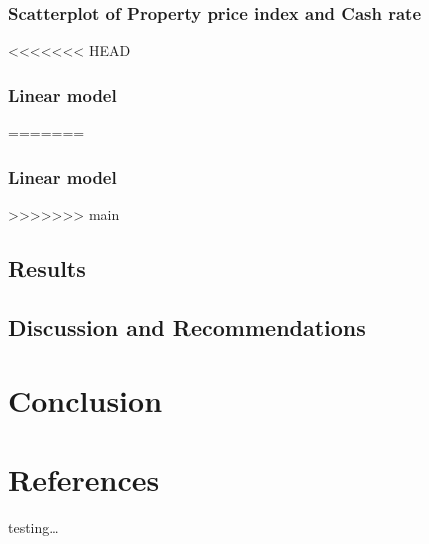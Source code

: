 \documentclass[11pt,a4paper,]{article}
\begin{document}
\hypertarget{scatterplot-of-property-price-index-and-cash-rate}{%
\subsubsection{Scatterplot of Property price index and Cash rate}\label{scatterplot-of-property-price-index-and-cash-rate}}

<<<<<<< HEAD
\hypertarget{linear-model-3}{%
\subsubsection{Linear model}\label{linear-model-3}}
=======
\hypertarget{linear-model-4}{%
\subsubsection{Linear model}\label{linear-model-4}}
>>>>>>> main

\hypertarget{results-4}{%
\subsection{Results}\label{results-4}}

\hypertarget{discussion-and-recommendations-4}{%
\subsection{Discussion and Recommendations}\label{discussion-and-recommendations-4}}

\hypertarget{conclusion}{%
\section{Conclusion}\label{conclusion}}

\hypertarget{references}{%
\section{References}\label{references}}

testing\ldots{}

\printbibliography
\end{document}
